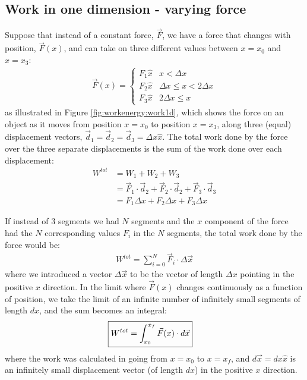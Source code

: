 \subsection{Work in one dimension - varying force}
Suppose that instead of a constant force, $\vec F$, we have a force that changes with position, $\vec F(x)$, and can take on three different values between $x=x_0$ and $x=x_3$:
\begin{align*}
  \vec F (x)=
  \begin{cases}
    F_1\hat x & x<\Delta x \\
    F_2\hat x & \Delta x \leq x< 2\Delta x \\
    F_3\hat x & 2\Delta x \leq x
  \end{cases}
\end{align*}
as illustrated in Figure \ref{fig:workenergy:work1d}, which shows the force on an object as it moves from position $x=x_0$ to position $x=x_3$, along three (equal) displacement vectors, $\vec d_1=\vec d_2=\vec d_3=\Delta x \hat x$. 
The total work done by the force over the three separate displacements is the sum of the work done over each displacement:
\begin{align*}
W^{tot}&=W_1+W_2+W_3\\
&=\vec F_1\cdot \vec d_2+\vec F_2\cdot \vec d_2+\vec F_3\cdot \vec d_3\\
&= F_1\Delta x +F_2\Delta x + F_3\Delta x
\end{align*} 

If instead of 3 segments we had $N$ segments and the $x$ component of the force had the $N$ corresponding values $F_i$ in the $N$ segments, the total work done by the force would be:
\begin{align*}
W^{tot} = \sum_{i=0}^N\vec F_i \cdot \Delta \vec x
\end{align*}
where we introduced a vector $\Delta \vec x$ to be the vector of length $\Delta x$ pointing in the positive $x$ direction. In the limit where $\vec F(x)$ changes continuously as a function of position, we take the limit of an infinite number of infinitely small segments of length $dx$, and the sum becomes an integral:
\begin{align}
\Aboxed{W^{tot} = \int_{x_0}^{x_f}\vec F(x) \cdot d\vec x}
\end{align}
where the work was calculated in going from $x=x_0$ to $x=x_f$, and $d\vec x=dx\hat x$ is an infinitely small displacement vector (of length $dx$) in the positive $x$ direction.

